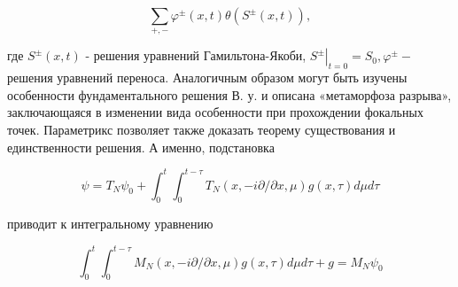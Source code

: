 \documentclass[10pt]{article}
\begin{document}
\[

\sum_{+,-} \varphi^{ \pm}(x, t) \theta\left(S^{ \pm}(x, t)\right),

\]



где $S^{ \pm}(x, t)$ - решения уравнений Гамильтона-Якоби, $\left.S^{ \pm}\right|_{t=0}=S_{0}, \varphi^{ \pm}-$решения уравнений переноса. Аналогичным образом могут быть изучены особенности фундаментального решения В. у. и описана «метаморфоза разрыва», заключающаяся в изменении вида особенности при прохождении фокальных точек. Параметрикс позволяет также доказать теорему существования и единственности решения. А именно, подстановка



\[

\psi=T_{N} \psi_{0}+\int_{0}^{t} \int_{0}^{t-\tau} T_{N}(x,-i \partial / \partial x, \mu) g(x, \tau) d \mu d \tau

\]



приводит к интегральному уравнению



\[

\int_{0}^{t} \int_{0}^{t-\tau} M_{N}(x,-i \partial / \partial x, \mu) g(x, \tau) d \mu d \tau+g=M_{N} \psi_{0}

\]
\end{document}
